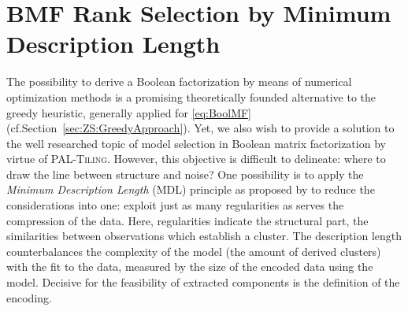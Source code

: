 \chapter{BMF Rank Selection by Minimum Description Length}
\label{chap:RankMDL}
The possibility to derive a Boolean factorization by means of  numerical optimization methods is a promising theoretically founded alternative to the greedy heuristic, generally applied for \ref{eq:BoolMF} (cf.\@ Section~\ref{sec:ZS:GreedyApproach}). Yet, we also wish to provide a solution to the well researched topic of model selection in Boolean matrix factorization by virtue of \textsc{PAL-Tiling}.  
However, this objective is difficult to delineate: where to draw the line between structure and noise? One possibility is to apply the \emph{Minimum Description Length} (MDL) principle as proposed by \cite{miettinen2014mdl4bmf} to reduce the considerations into one: exploit just as many regularities as serves the compression of the data. Here, regularities indicate the structural part, 
the similarities between observations which establish a cluster. The description length counterbalances the complexity of the model (the amount of derived clusters) with the fit to the data, measured by the size of the encoded data using the model. Decisive for the feasibility of extracted components is the definition of the encoding. 

